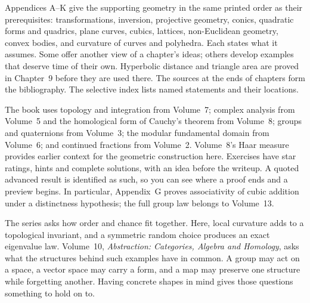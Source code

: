 Appendices A--K give the supporting geometry in the same printed order as
their prerequisites: transformations, inversion, projective geometry,
conics, quadratic forms and quadrics, plane curves, cubics, lattices,
non-Euclidean geometry, convex bodies, and curvature of curves and
polyhedra. Each states what it assumes. Some offer another view of a
chapter's ideas; others develop examples that deserve time of their own.
Hyperbolic distance and triangle area are proved in Chapter~9 before they
are used there. The sources at the ends of chapters form the bibliography.
The selective index lists named statements and their locations.

The book uses topology and integration from Volume~7; complex analysis
from Volume~5 and the homological form of Cauchy's theorem from Volume~8;
groups and quaternions from Volume~3; the modular fundamental domain from
Volume~6; and continued fractions from Volume~2. Volume~8's Haar measure
provides earlier context for the geometric construction here. Exercises
have star ratings, hints and complete solutions, with an idea before the
writeup. A quoted advanced result is identified as such, so you can see
where a proof ends and a preview begins. In particular, Appendix~G proves
associativity of cubic addition under a distinctness hypothesis; the full
group law belongs to Volume~13.

The series asks how order and chance fit together. Here, local curvature
adds to a topological invariant, and a symmetric random choice produces
an exact eigenvalue law. Volume~10, \emph{Abstraction: Categories, Algebra and Homology}, asks what the
structures behind such examples have in common. A group may act on a
space, a vector space may carry a form, and a map may preserve one
structure while forgetting another. Having concrete shapes in mind gives
those questions something to hold on to.
